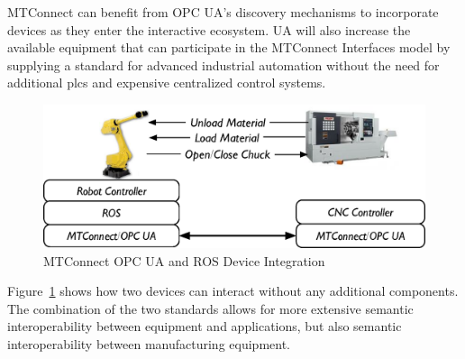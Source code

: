 MTConnect can benefit from OPC UA's discovery mechanisms to incorporate devices as they enter the interactive ecosystem.  UA will also increase the available equipment that can participate in the MTConnect Interfaces model by supplying a standard for advanced industrial automation without the need for additional \glspl{plc} and expensive centralized control systems.

\begin{figure}[ht]
    \centering
    \includegraphics[width=\textwidth]{diagrams/device-integration.eps}
    \caption{MTConnect OPC UA and ROS Device Integration}
    \label{fig:mtconnect-ros-opc}
\end{figure}

Figure~\ref{fig:mtconnect-ros-opc} shows how two devices can interact without any additional components. The combination of the two standards allows for more extensive semantic interoperability between equipment and applications,  but also semantic interoperability between manufacturing equipment. 

\FloatBarrier
